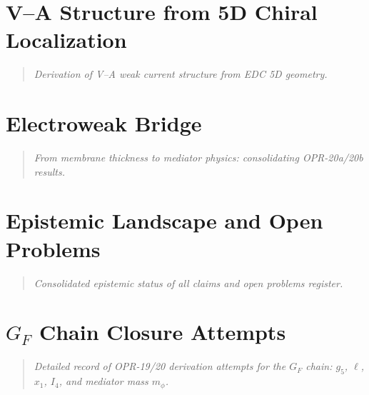 \documentclass[11pt,a4paper]{book}
\theoremstyle{definition}
\theoremstyle{remark}
\begin{document}
\chapter{V--A Structure from 5D Chiral Localization}
\label{ch:va_structure}

\begin{quote}
\textit{Derivation of V--A weak current structure from EDC 5D geometry.}
\end{quote}



\chapter{Electroweak Bridge}
\label{ch:electroweak_bridge}

\begin{quote}
\textit{From membrane thickness to mediator physics: consolidating OPR-20a/20b results.}
\end{quote}



\chapter{Epistemic Landscape and Open Problems}
\label{ch:epistemic_map}

\begin{quote}
\textit{Consolidated epistemic status of all claims and open problems register.}
\end{quote}



\chapter{$G_F$ Chain Closure Attempts}
\label{ch:gf_closure}

\begin{quote}
\textit{Detailed record of OPR-19/20 derivation attempts for the $G_F$ chain:
$g_5$, $\ell$, $x_1$, $I_4$, and mediator mass $m_\phi$.}
\end{quote}
\end{document}
